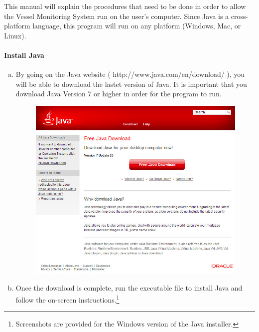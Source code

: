 \documentclass{article}
\begin{document}
This manual will explain the procedures that need to be done in order to allow the Vessel Monitoring System run on the user's computer. Since Java is a cross-platform language, this program will run on any platform (Windows, Mac, or Linux).

\paragraph{Install Java \\}
\begin{enumerate}[(a)]
  \item By going on the Java website ( http://www.java.com/en/download/ ), you will be able to download the lastet version of Java. It is important that you download Java Version 7 or higher in order for the program to run.
	\begin{figure}[!htb]
	\centering
	\includegraphics[scale=0.55]{images/javaInstall1.jpg}
	\end{figure}
\pagebreak
  \item Once the download is complete, run the executable file to install Java and follow the on-screen instructions.\footnote{Screenshots are provided for the Windows version of the Java installer.}
	\begin{figure}[!htb]
	\centering

\end{figure}
\end{enumerate}
\end{document}
